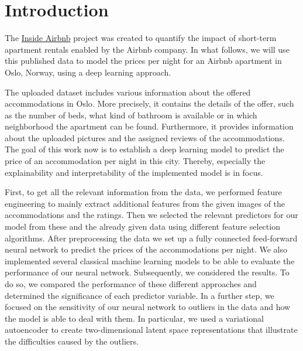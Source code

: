 \section{Introduction}


The \href{http://insideairbnb.com/get-the-data.html}{Inside Airbnb} project \citep{cox2022} was created to quantify the impact of short-term apartment rentals enabled by the Airbnb company.
In what follows, we will use this published data to model the prices per night for an Airbnb apartment in Oslo, Norway, using a deep learning approach.

The uploaded dataset includes various information about the offered accommodations in Oslo. More precisely, it contains the details of the offer, such as the number of beds, what kind of bathroom is available or in which neighborhood the apartment can be found. Furthermore, it provides information about the uploaded pictures and the assigned reviews of the accommodations.
The goal of this work now is to establish a deep learning model to predict the price of an accommodation per night in this city. Thereby, especially the explainability and interpretability of the implemented model is in focus.

First, to get all the relevant information from the data, we performed feature engineering to mainly extract additional features from the given images of the accommodations and the ratings. Then we selected the relevant predictors for our model from these and the already given data using different feature selection algorithms. After preprocessing the data we set up a fully connected feed-forward neural network to predict the prices of the accommodations per night. We also implemented several classical machine learning models to be able to evaluate the performance of our neural network.
Subsequently, we considered the results. To do so, we compared the performance of these different approaches and determined the significance of each predictor variable. In a further step, we focused on the sensitivity of our neural network to outliers in the data and how the model is able to deal with them. In particular, we used a variational autoencoder to create two-dimensional latent space representations that illustrate the difficulties caused by the outliers.

